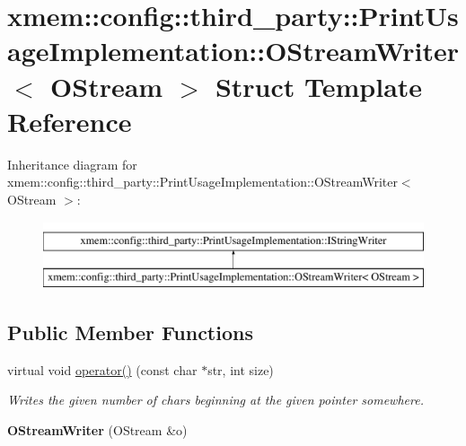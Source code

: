 \hypertarget{structxmem_1_1config_1_1third__party_1_1_print_usage_implementation_1_1_o_stream_writer}{\section{xmem\-:\-:config\-:\-:third\-\_\-party\-:\-:Print\-Usage\-Implementation\-:\-:O\-Stream\-Writer$<$ O\-Stream $>$ Struct Template Reference}
\label{structxmem_1_1config_1_1third__party_1_1_print_usage_implementation_1_1_o_stream_writer}
}
Inheritance diagram for xmem\-:\-:config\-:\-:third\-\_\-party\-:\-:Print\-Usage\-Implementation\-:\-:O\-Stream\-Writer$<$ O\-Stream $>$\-:\begin{figure}[H]
\begin{center}
\leavevmode
\includegraphics[height=2.000000cm]{structxmem_1_1config_1_1third__party_1_1_print_usage_implementation_1_1_o_stream_writer}
\end{center}
\end{figure}
\subsection*{Public Member Functions}
\begin{DoxyCompactItemize}
\item 
\hypertarget{structxmem_1_1config_1_1third__party_1_1_print_usage_implementation_1_1_o_stream_writer_a3b530bd8c2066ce1e77ccdd48f593f8d}{virtual void \hyperlink{structxmem_1_1config_1_1third__party_1_1_print_usage_implementation_1_1_o_stream_writer_a3b530bd8c2066ce1e77ccdd48f593f8d}{operator()} (const char $\ast$str, int size)}\label{structxmem_1_1config_1_1third__party_1_1_print_usage_implementation_1_1_o_stream_writer_a3b530bd8c2066ce1e77ccdd48f593f8d}

\begin{DoxyCompactList}\small\item\em Writes the given number of chars beginning at the given pointer somewhere. \end{DoxyCompactList}\item 
\hypertarget{structxmem_1_1config_1_1third__party_1_1_print_usage_implementation_1_1_o_stream_writer_a44255b54f77d5ec3fecc583615bc222d}{{\bfseries O\-Stream\-Writer} (O\-Stream \&o)}\label{structxmem_1_1config_1_1third__party_1_1_print_usage_implementation_1_1_o_stream_writer_a44255b54f77d5ec3fecc583615bc222d}

\end{DoxyCompactItemize}

